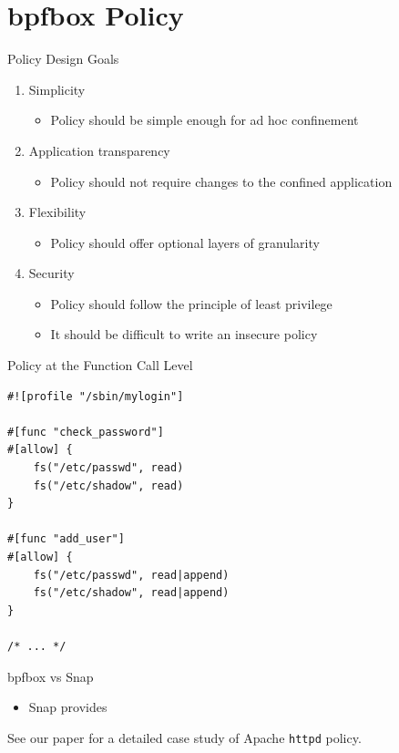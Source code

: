 \documentclass[12pt, dvipsnames]{beamer}
\begin{document}
\section{bpfbox Policy}

\begin{frame}[c]{Policy Design Goals}
\begin{enumerate}
    \item Simplicity
    \begin{itemize}
        \item Policy should be simple enough for ad hoc confinement
    \end{itemize}
    \vfill
    \item Application transparency
    \begin{itemize}
        \item Policy should not require changes to the confined application
    \end{itemize}
    \vfill
    \item Flexibility
    \begin{itemize}
        \item Policy should offer optional layers of granularity
    \end{itemize}
    \vfill
    \item Security
    \begin{itemize}
        \item Policy should follow the principle of least privilege
        \item It should be difficult to write an insecure policy
    \end{itemize}
\end{enumerate}
\end{frame}

\begin{frame}[c, fragile]{Policy at the Function Call Level}
\begin{lstlisting}[language=bpfbox, xleftmargin=.25\textwidth]
#![profile "/sbin/mylogin"]

#[func "check_password"]
#[allow] {
    fs("/etc/passwd", read)
    fs("/etc/shadow", read)
}

#[func "add_user"]
#[allow] {
    fs("/etc/passwd", read|append)
    fs("/etc/shadow", read|append)
}

/* ... */
\end{lstlisting}
\end{frame}

\begin{frame}[c]{bpfbox vs Snap}
\begin{itemize}
    \item Snap provides
\end{itemize}
\vfill
See our paper for a detailed case study of Apache \texttt{httpd} policy.
\end{frame}
\end{document}
